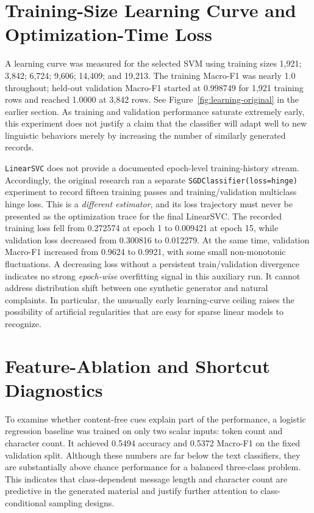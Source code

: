 \section{Training-Size Learning Curve and Optimization-Time Loss}
A learning curve was measured for the selected SVM using training sizes 1,921; 3,842; 6,724; 9,606; 14,409; and 19,213. The training Macro-F1 was nearly 1.0 throughout; held-out validation Macro-F1 started at 0.998749 for 1,921 training rows and reached 1.0000 at 3,842 rows. See Figure~\ref{fig:learning-original} in the earlier section. As training and validation performance saturate extremely early, this experiment does not justify a claim that the classifier will adapt well to new linguistic behaviors merely by increasing the number of similarly generated records.

\texttt{LinearSVC} does not provide a documented epoch-level training-history stream. Accordingly, the original research ran a separate \texttt{SGDClassifier(loss=hinge)} experiment to record fifteen training passes and training/validation multiclass hinge loss. This is a \emph{different estimator}, and its loss trajectory must never be presented as the optimization trace for the final LinearSVC. The recorded training loss fell from 0.272574 at epoch 1 to 0.009421 at epoch 15, while validation loss decreased from 0.300816 to 0.012279. At the same time, validation Macro-F1 increased from 0.9624 to 0.9921, with some small non-monotonic fluctuations.
A decreasing loss without a persistent train/validation divergence indicates no strong \emph{epoch-wise} overfitting signal in this auxiliary run. It cannot address distribution shift between one synthetic generator and natural complaints. In particular, the unusually early learning-curve ceiling raises the possibility of artificial regularities that are easy for sparse linear models to recognize.

\section{Feature-Ablation and Shortcut Diagnostics}
To examine whether content-free cues explain part of the performance, a logistic regression baseline was trained on only two scalar inputs: token count and character count. It achieved 0.5494 accuracy and 0.5372 Macro-F1 on the fixed validation split. Although these numbers are far below the text classifiers, they are substantially above chance performance for a balanced three-class problem. This indicates that class-dependent message length and character count are predictive in the generated material and justify further attention to class-conditional sampling designs.

